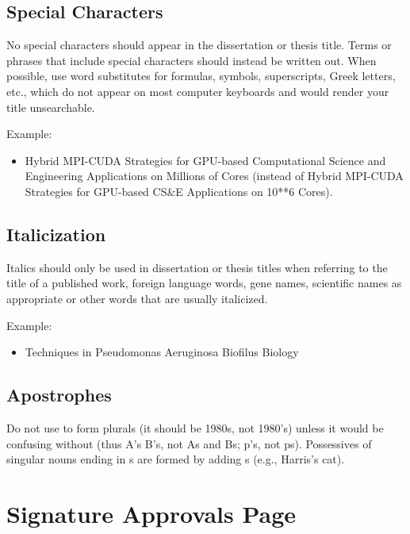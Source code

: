 \subsection{Special Characters}

No special characters should appear in the dissertation or thesis title.  Terms or phrases that include special characters should instead be written out.  When possible, use word substitutes for formulas, symbols, superscripts, Greek letters, etc., which do not appear on most computer keyboards and would render your title unsearchable.

Example:

\begin{itemize}
\item Hybrid MPI-CUDA Strategies for GPU-based Computational Science and
Engineering Applications on Millions of Cores (instead of Hybrid
MPI-CUDA Strategies for GPU-based CS\&E Applications on 10**6 Cores).

\end{itemize}

\subsection{Italicization}

Italics should only be used in dissertation or thesis titles when referring to the title of a published work, foreign language words, gene names, scientific names as appropriate or other words that are usually italicized.

Example:

\begin{itemize}
\item Techniques in Pseudomonas Aeruginosa Biofilus Biology

\end{itemize}

\subsection{Apostrophes}

Do not use to form plurals (it should be 1980s, not 1980's) unless it would be confusing without (thus A's B's, not As and Bs; p's, not ps).  Possessives of singular nouns ending in s are formed by adding s (e.g., Harris's cat).

\section{Signature Approvals Page}

